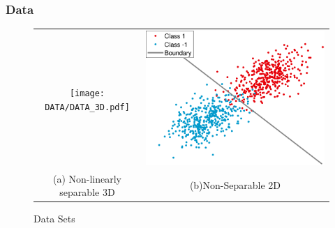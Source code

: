 \documentclass[11pts]{beamer}
\begin{document}
\begin{frame}%
\frametitle{Data}

\begin{figure}[ht]
 \begin{tabular}{cc}
     \texttt{[image: DATA/DATA\_3D.pdf]} &
    \includegraphics[scale=0.4]{DATA/CLASSNS.pdf}
   \\
    (a) Non-linearly separable 3D& (b)Non-Separable 2D \\
 \end{tabular}
 \bigskip
 \caption{Data Sets}
\end{figure}
\end{frame}

\end{document}

